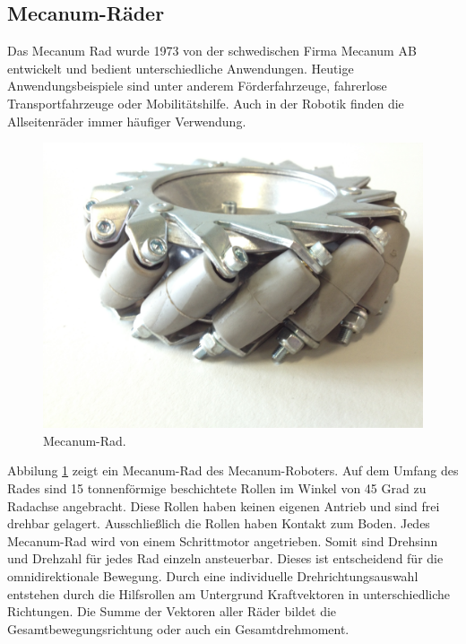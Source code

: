 \subsection*{Mecanum-Räder}
\label{sec:Mecanum-Räder}
Das Mecanum Rad wurde 1973 von der schwedischen Firma Mecanum AB entwickelt und bedient unterschiedliche Anwendungen. Heutige Anwendungsbeispiele sind unter anderem Förderfahrzeuge, fahrerlose Transportfahrzeuge oder Mobilitätshilfe. Auch in der Robotik finden die Allseitenräder immer häufiger Verwendung.
\begin{figure}[H]
\centering
 \includegraphics[width=.6\textwidth]{Abbildungen/Mecanumrad} 
\caption[Mecanum-Rad]{Mecanum-Rad.}
\label{fig:Mecanum-Rad}
\end{figure}
Abbilung \ref{fig:Mecanum-Rad} zeigt ein Mecanum-Rad des Mecanum-Roboters. Auf dem Umfang des Rades sind 15 tonnenförmige beschichtete Rollen im Winkel von 45 Grad zu Radachse angebracht. Diese Rollen haben keinen eigenen Antrieb und sind frei drehbar gelagert. Ausschließlich die Rollen haben Kontakt zum Boden.
Jedes Mecanum-Rad wird von einem Schrittmotor angetrieben. Somit sind Drehsinn und Drehzahl für jedes Rad einzeln ansteuerbar. Dieses ist entscheidend für die omnidirektionale Bewegung.
Durch eine individuelle Drehrichtungsauswahl entstehen durch die Hilfsrollen am Untergrund Kraftvektoren in unterschiedliche Richtungen. Die Summe der Vektoren aller Räder bildet die Gesamtbewegungsrichtung oder auch ein Gesamtdrehmoment.





















